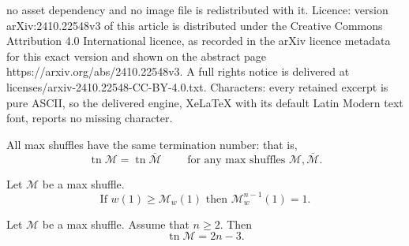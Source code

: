 \documentclass[10pt,a4paper]{amsart}
\newcommand{\Mo}{\overline{\mathcal{M}}} %
\newcommand{\Mw}{\mathcal{M}_w} %
\newcommand{\M}{\mathcal{M}} %
\newcommand{\tn}{\operatorname{tn }} %
\newcommand{\tup}[1]{\left( #1 \right)}
\begin{document}
no asset dependency and no image file is redistributed with it. Licence: version arXiv:2410.22548v3 of this article is distributed under the Creative Commons Attribution 4.0 International licence, as recorded in the arXiv licence metadata for this exact version and shown on the abstract page https://arxiv.org/abs/2410.22548v3. A full rights notice is delivered at licenses/arxiv-2410.22548-CC-BY-4.0.txt. Characters: every retained excerpt is pure ASCII, so the delivered engine, XeLaTeX with its default Latin Modern text font, reports no missing character.
\begin{thm}
    \label{mshufSt2}
    All max shuffles have the same termination number: that is,
    \[
    \tn \M = \tn \Mo \qquad \text{ for any max shuffles } \M,\Mo .
    \]
\end{thm}

\begin{cor}
    \label{max-term-cor}
    Let $ \M $ be a max shuffle. 
    \[
        \text{If } w\tup{1} \ge \Mw\tup{ 1 } \text{ then } \Mw^{n-1}\tup{ 1 } = 1 .
    \]
\end{cor}

\begin{thm}
    \label{mshufTN}
    Let $\M $ be a max shuffle. Assume that $n \ge 2$. Then 
    \[
    \tn \M = 2n-3.
    \]
\end{thm}
\end{document}
